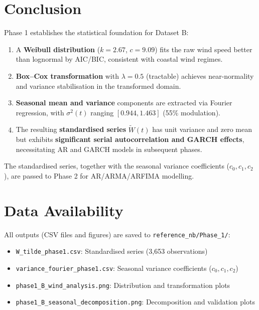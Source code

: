 \documentclass[11pt]{article}
\begin{document}
\section{Conclusion}

Phase 1 establishes the statistical foundation for Dataset B:

\begin{enumerate}
  \item A \textbf{Weibull distribution} ($k=2.67$, $c=9.09$) fits the raw wind speed better than lognormal by AIC/BIC, consistent with coastal wind regimes.
  \item \textbf{Box--Cox transformation} with $\lambda = 0.5$ (tractable) achieves near-normality and variance stabilisation in the transformed domain.
  \item \textbf{Seasonal mean and variance} components are extracted via Fourier regression, with $\sigma^2(t)$ ranging $[0.944, 1.463]$ (55\% modulation).
  \item The resulting \textbf{standardised series} $\widetilde{W}(t)$ has unit variance and zero mean but exhibits \textbf{significant serial autocorrelation and GARCH effects}, necessitating AR and GARCH models in subsequent phases.
\end{enumerate}

The standardised series, together with the seasonal variance coefficients ($c_0, c_1, c_2$), are passed to Phase 2 for AR/ARMA/ARFIMA modelling.

\section*{Data Availability}

All outputs (CSV files and figures) are saved to \texttt{reference\_nb/Phase\_1/}:
\begin{itemize}
  \item \texttt{W\_tilde\_phase1.csv}: Standardised series (3,653 observations)
  \item \texttt{variance\_fourier\_phase1.csv}: Seasonal variance coefficients ($c_0, c_1, c_2$)
  \item \texttt{phase1\_B\_wind\_analysis.png}: Distribution and transformation plots
  \item \texttt{phase1\_B\_seasonal\_decomposition.png}: Decomposition and validation plots
\end{itemize}
\end{document}
